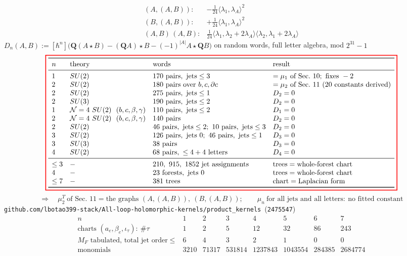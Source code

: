 \documentclass[10pt]{article}
\newcommand{\tagbox}[1]{\fbox{\footnotesize #1}}
\newcommand{\sred}[1]{{\setlength{\fboxrule}{1.1pt}\fcolorbox{red}{white}{$\displaystyle #1$}}}
\begin{document}
\[
\begin{array}{ll}
(A,(A,B)): & -\tfrac1{24}\langle\lambda_1,\lambda_A\rangle^2\\[2pt]
(B,(A,B)): & +\tfrac1{24}\langle\lambda_1,\lambda_A\rangle^2\\[2pt]
(A,B)\,(A,B): & \tfrac1{24}\big\langle\lambda_1,\lambda_2+2\lambda_A\big\rangle\big\langle\lambda_2,\lambda_1+2\lambda_A\big\rangle
\end{array}
\]
\tagbox{checks}\quad $D_n(A,B):=[\hbar^n]\big(\mathbf Q(A\star B)-(\mathbf QA)\star B-(-1)^{|A|}A\star\mathbf QB\big)$ on random words, full letter algebra, mod $2^{31}-1$
{\small\[
\sred{\begin{array}{llll}
\toprule
n & \text{theory} & \text{words} & \text{result}\\\midrule
1 & SU(2) & 170\text{ pairs},\ \text{jets}\le3 & =\mu_1\text{ of Sec.\ 10};\ \text{fixes }-2\\
2 & SU(2) & 180\text{ pairs over }b,c,\partial c & =\mu_2\text{ of Sec.\ 11}\ (20\text{ constants derived})\\
2 & SU(2) & 275\text{ pairs},\ \text{jets}\le1 & D_2=0\\
2 & SU(3) & 190\text{ pairs},\ \text{jets}\le2 & D_2=0\\
1 & \mathcal N=4\ SU(2)\ \ (b,c,\beta,\gamma) & 110\text{ pairs},\ \text{jets}\le2 & D_1=0\\
2 & \mathcal N=4\ SU(2)\ \ (b,c,\beta,\gamma) & 140\text{ pairs} & D_2=0\\
2 & SU(2) & 46\text{ pairs},\ \text{jets}\le2;\ 10\text{ pairs},\ \text{jets}\le3 & D_2=0\\
3 & SU(2) & 126\text{ pairs},\ \text{jets }0;\ 46\text{ pairs},\ \text{jets}\le1 & D_3=0\\
3 & SU(3) & 38\text{ pairs} & D_3=0\\
4 & SU(2) & 68\text{ pairs},\ \le4+4\text{ letters} & D_4=0\\\midrule
\le3 & - & 210,\ 915,\ 1852\text{ jet assignments} & \text{trees}=\text{whole-forest chart}\\
4 & - & 23\text{ forests},\ \text{jets }0 & \text{trees}=\text{whole-forest chart}\\
\le7 & - & 381\text{ trees} & \text{chart}=\text{Laplacian form}\\\bottomrule
\end{array}}
\]}
\[
\Rightarrow\quad \mu_2^T\ \text{of Sec.\ 11}=\text{the graphs }(A,(A,B)),\ (B,(A,B));\qquad \mu_n\ \text{for all jets and all letters}:\ \text{no fitted constant}
\]
\tagbox{tables}\quad \texttt{github.com/lbotao399-stack/All-loop-holomorphic-kernels/product\_kernels}\ (\texttt{2475547})
\[
\begin{array}{l|ccccccc}
n & 1&2&3&4&5&6&7\\\hline
\text{charts }(a_e,\beta_e,\iota_\tau):\ \#\tau & 1&2&5&12&32&86&243\\
M_F\text{ tabulated, total jet order}\le & 6&4&3&2&1&0&0\\
\text{monomials} & 3210 & 71317 & 531814 & 1237843 & 1043554 & 284385 & 2684774
\end{array}
\]
\end{document}

